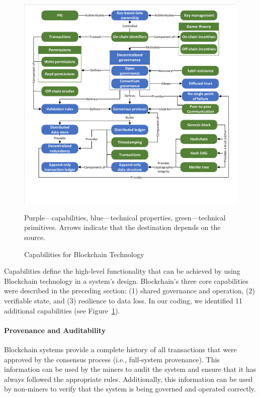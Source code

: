 \begin{figure}
	\centering
	\includegraphics[page=4,width=\columnwidth]{figures/grounded-theory-main}
	
	{\small Purple---capabilities, blue---technical properties, green---technical primitives. Arrows indicate that the destination depends on the source.}
	\caption{Capabilities for Blockchain Technology}
	\label{fig:Capabilities}
\end{figure}

Capabilities define the high-level functionality that can be achieved by using Blockchain technology in a system's design.
Blockchain's three core capabilities were described in the preceding section: (1) shared governance and operation, (2) verifiable state, and (3) resilience to data loss.
In our coding, we identified 11 additional capabilities (see Figure~\ref{fig:Capabilities}).

\paragraph{Provenance and Auditability}
Blockchain systems provide a complete history of all transactions that were approved by the consensus process (i.e., full-system provenance).
This information can be used by the miners to audit the system and ensure that it has always followed the appropriate rules.
Additionally, this information can be used by non-miners to verify that the system is being governed and operated correctly.

